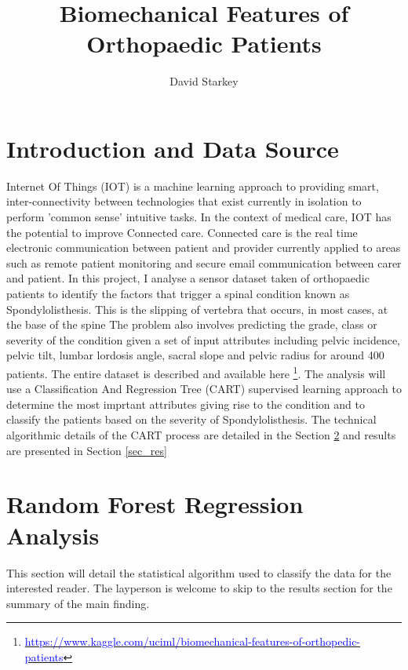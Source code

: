 \documentclass[10pt]{article}
\begin{document}
\title{Biomechanical Features of Orthopaedic Patients}

\author{David Starkey}

\maketitle





\section{Introduction and Data Source}



Internet Of Things (IOT) is a machine learning approach to providing smart, inter-connectivity between technologies that exist currently in isolation to perform 'common sense' intuitive tasks. In the context of medical care, IOT has the potential to improve Connected care. Connected care is the real time electronic communication between patient and provider currently applied to areas such as remote patient monitoring and secure email communication between carer and patient. In this project, I analyse a sensor dataset taken of orthopaedic patients to identify the factors that trigger a spinal condition known as Spondylolisthesis. This is the slipping of vertebra that occurs, in most cases, at the base of the spine The problem also involves predicting the grade, class or severity of the condition given a set of input attributes including pelvic incidence, pelvic tilt, lumbar lordosis angle, sacral slope and pelvic radius for around 400 patients. The entire dataset is described and available here \footnote{\href{ https://www.kaggle.com/uciml/biomechanical-features-of-orthopedic-patients}{\textcolor{blue}{https://www.kaggle.com/uciml/biomechanical-features-of-orthopedic-patients}}}. The analysis will use a Classification And Regression Tree (CART) supervised learning approach to determine the most imprtant attributes giving rise to the condition and to classify the patients based on the severity of Spondylolisthesis. The technical algorithmic details of the CART process are detailed in the Section \ref{sec_rf} and results are presented in Section \ref{sec_res}




\section{Random Forest Regression Analysis}
\label{sec_rf}
This section will detail the statistical algorithm used to classify the data for the interested reader. The layperson is welcome to skip to the results section for the summary of the main finding.
\end{document}
